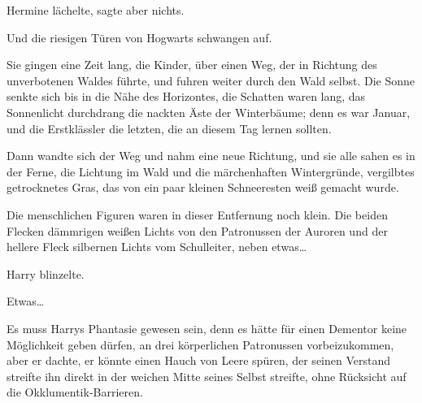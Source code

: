 Hermine lächelte, sagte aber nichts.

Und die riesigen Türen von Hogwarts schwangen auf.

Sie gingen eine Zeit lang, die Kinder, über einen Weg, der in Richtung des unverbotenen Waldes führte, und fuhren weiter durch den Wald selbst. Die Sonne senkte sich bis in die Nähe des Horizontes, die Schatten waren lang, das Sonnenlicht durchdrang die nackten Äste der Winterbäume; denn es war Januar, und die Erstklässler die letzten, die an diesem Tag lernen sollten.

Dann wandte sich der Weg und nahm eine neue Richtung, und sie alle sahen es in der Ferne, die Lichtung im Wald und die märchenhaften Wintergründe, vergilbtes getrocknetes Gras, das von ein paar kleinen Schneeresten weiß gemacht wurde.

Die menschlichen Figuren waren in dieser Entfernung noch klein. Die beiden Flecken dämmrigen weißen Lichts von den Patronussen der Auroren und der hellere Fleck silbernen Lichts vom Schulleiter, neben etwas…

Harry blinzelte.

Etwas…

Es muss Harrys Phantasie gewesen sein, denn es hätte für einen Dementor keine Möglichkeit geben dürfen, an drei körperlichen Patronussen vorbeizukommen, aber er dachte, er könnte einen Hauch von Leere spüren, der seinen Verstand streifte ihn direkt in der weichen Mitte seines Selbst streifte, ohne Rücksicht auf die Okklumentik-Barrieren.

